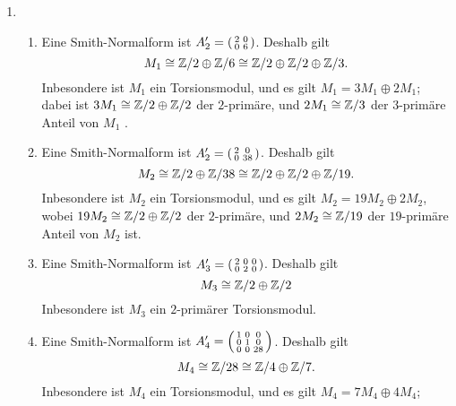 \begin{solution}
  \begin{enumerate}
    \item
      \begin{enumerate}
        \item
          Eine Smith-Normalform ist $A_2' = \begin{psmallmatrix} 2 & 0 \\ 0 & 6 \end{psmallmatrix}$.
          Deshalb gilt
          \[
                  M_1
            \cong \mathbb{Z}/2 \oplus \mathbb{Z}/6
            \cong \mathbb{Z}/2 \oplus \mathbb{Z}/2 \oplus \mathbb{Z}/3.
          \]
          Inbesondere ist $M_1$ ein Torsionsmodul, und es gilt $M_1 = 3 M_1\oplus 2 M_1$;
          dabei ist $3 M_1 \cong \mathbb{Z}/2 \oplus \mathbb{Z}/2$ der $2$-primäre, und $2 M_1 \cong \mathbb{Z}/3$ der $3$-primäre Anteil von $M_1$ .
        \item
          Eine Smith-Normalform ist $A_2' = \begin{psmallmatrix} 2 & 0 \\ 0 & 38 \end{psmallmatrix}$.
          Deshalb gilt
          \[
                  M_2
            \cong \mathbb{Z}/2 \oplus \mathbb{Z}/38
            \cong \mathbb{Z}/2 \oplus \mathbb{Z}/2 \oplus \mathbb{Z}/19.
          \]
          Inbesondere ist $M_2$ ein Torsionsmodul, und es gilt $M_2 = 19 M_2 \oplus 2 M_2$, wobei $19 M_2 \cong \mathbb{Z}/2 \oplus \mathbb{Z}/2$ der $2$-primäre, und $2 M_2 \cong \mathbb{Z}/19$ der $19$-primäre Anteil von $M_2$ ist.
        \item
          Eine Smith-Normalform ist $A_3' = \begin{psmallmatrix} 2 & 0 & 0 \\ 0 & 2 & 0 \end{psmallmatrix}$.
          Deshalb gilt
          \[
                  M_3
            \cong \mathbb{Z}/2 \oplus \mathbb{Z}/2
          \]
          Inbesondere ist $M_3$ ein $2$-primärer Torsionsmodul.
        \item
          Eine Smith-Normalform ist $A_4' = \begin{psmallmatrix} 1 & 0 & 0 \\ 0 & 1 & 0 \\ 0 & 0 & 28 \end{psmallmatrix}$.
          Deshalb gilt
          \[
                  M_4
            \cong \mathbb{Z}/28
            \cong \mathbb{Z}/4 \oplus \mathbb{Z}/7.
          \]
          Inbesondere ist $M_4$ ein Torsionsmodul, und es gilt $M_4 = 7 M_4 \oplus 4 M_4$;

\end{enumerate}
\end{enumerate}
\end{solution}
